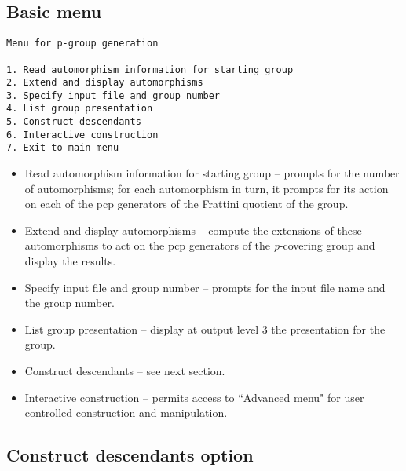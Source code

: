 \subsection{Basic menu}
\begin{verbatim}
Menu for p-group generation
-----------------------------
1. Read automorphism information for starting group
2. Extend and display automorphisms 
3. Specify input file and group number
4. List group presentation
5. Construct descendants
6. Interactive construction
7. Exit to main menu
\end{verbatim}

\begin{itemize}
\item Read automorphism information for starting group --
prompts for the number of automorphisms; for each automorphism
in turn, it prompts for its action on each of the pcp
generators of the Frattini quotient of the group. 

\item Extend and display automorphisms -- compute the extensions
of these automorphisms to act on the pcp generators of the 
{\it p}-covering group and display the results. 

\item Specify input file and group number -- prompts for the
input file name and the group number.

\item List group presentation -- display at output level 3 the 
presentation for the group.

\item Construct descendants -- see next section.

\item Interactive construction -- permits access to ``Advanced menu" 
for user controlled construction and manipulation.

\end{itemize}
\subsection{Construct descendants option}

